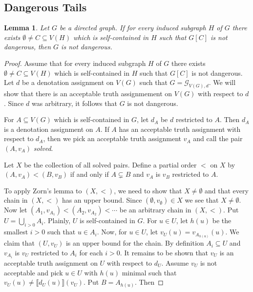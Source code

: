 \documentclass[12pt]{article}
\newtheorem{lem}[thm]{Lemma}
\theoremstyle{remark}
\newcommand{\fancy}[1]{\mathcal{#1}}
\def\G{\fancy{G}}
\begin{document}
\subsection{Dangerous Tails}
\begin{lem}\label{GeneralZorn}
Let $G$ be a directed graph. If for every induced subgraph $H$ of $G$ there exists $\emptyset \neq C \subseteq V(H)$ which is self-contained in $H$ such that $G[C]$ is not dangerous, then $G$ is not dangerous.
\end{lem}
\begin{proof}
Assume that for every induced subgraph $H$ of $G$ there exists $\emptyset \neq C \subseteq V(H)$ which is self-contained in $H$ such that $G[C]$ is not dangerous.  Let $d$ be a denotation assignment on $V(G)$ such that $G = \G_{V(G), d}$. We will show that there is an acceptable truth assignmement on $V(G)$ with respect to $d$.  Since $d$ was arbitrary, it follows that $G$ is not dangerous.\newline

For $A \subseteq V(G)$ which is self-contained in $G$, let $d_A$ be $d$ restricted to $A$.  Then $d_A$ is a denotation assignment on $A$.  If $A$ has an  acceptable truth assignment with respect to $d_A$, then we pick an acceptable truth assignment $v_A$ and call the pair $(A, v_A)$ \emph{solved}.\newline

Let $X$ be the collection of all solved pairs.  Define a partial order $<$ on $X$ by $(A, v_A) < (B, v_B)$ if and only if $A \subsetneq B$ and $v_A$ is $v_B$ restricted to $A$.\newline

To apply Zorn's lemma to $(X, <)$, we need to show that $X \neq \emptyset$ and that every chain in  $(X, <)$ has an upper bound. Since $(\emptyset, v_\emptyset) \in X$ we see that $X \neq \emptyset$.  Now let $(A_1, v_{A_1}) < (A_2, v_{A_2}) < \cdots$ be an arbitrary chain in $(X, <)$.  Put $U = \bigcup_{i > 0} A_i$. Plainly, $U$ is self-contained in $G$. For $u \in U$, let $h(u)$ be the smallest $i > 0$ such that $u \in A_i$.  Now, for $u \in U$, let $v_U(u) = v_{A_{h(u)}}(u)$.  We claim that $(U, v_U)$ is an upper bound for the chain.  By definition $A_i \subseteq U$ and $v_{A_i}$ is $v_U$ restricted to $A_i$ for each $i > 0$.  It remains to be shown that $v_U$ is an acceptable truth assignment on $U$ with respect to $d_U$.  Assume $v_U$ is not acceptable and pick $u \in U$ with $h(u)$ minimal such that $v_U(u) \neq \llbracket d_U(u)\rrbracket(v_U)$.  Put $B = A_{h(u)}$. Then


\end{proof}
\end{document}
